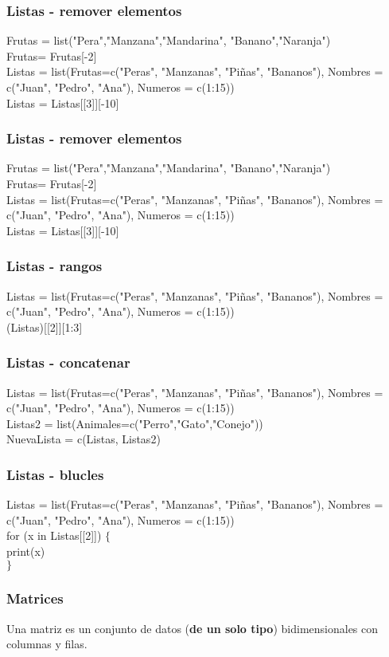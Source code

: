 \documentclass[14pt]{beamer}
\begin{document}
\begin{frame}
	\frametitle{Listas - remover elementos}
	Frutas = list("Pera","Manzana","Mandarina", "Banano","Naranja")\\
	Frutas= Frutas[-2]\\
	Listas = list(Frutas=c("Peras", "Manzanas", "Piñas", "Bananos"), Nombres = c("Juan", "Pedro", "Ana"), Numeros = c(1:15))\\
	Listas = Listas[[3]][-10]
\end{frame}

\begin{frame}
	\frametitle{Listas - remover elementos}
	Frutas = list("Pera","Manzana","Mandarina", "Banano","Naranja")\\
	Frutas= Frutas[-2]\\
	Listas = list(Frutas=c("Peras", "Manzanas", "Piñas", "Bananos"), Nombres = c("Juan", "Pedro", "Ana"), Numeros = c(1:15))\\
	Listas = Listas[[3]][-10]
\end{frame}

\begin{frame}
	\frametitle{Listas - rangos}
	Listas = list(Frutas=c("Peras", "Manzanas", "Piñas", "Bananos"), Nombres = c("Juan", "Pedro", "Ana"), Numeros = c(1:15))\\
	(Listas)[[2]][1:3]
\end{frame}

\begin{frame}
	\frametitle{Listas - concatenar}
	Listas = list(Frutas=c("Peras", "Manzanas", "Piñas", "Bananos"), Nombres = c("Juan", "Pedro", "Ana"), Numeros = c(1:15))\\
	Listas2 = list(Animales=c("Perro","Gato","Conejo"))\\
	NuevaLista = c(Listas, Listas2)
\end{frame}

\begin{frame}
	\frametitle{Listas - blucles}
	Listas = list(Frutas=c("Peras", "Manzanas", "Piñas", "Bananos"), Nombres = c("Juan", "Pedro", "Ana"), Numeros = c(1:15))\\

	\vspace{0.5cm}
	for (x in Listas[[2]]) $\{$\\
		print(x)\\
	$\}$
\end{frame}

\begin{frame}
	\frametitle{Matrices}
	Una matriz es un conjunto de datos (\textbf{de un solo tipo}) bidimensionales con columnas y filas.
\end{frame}
\end{document}
